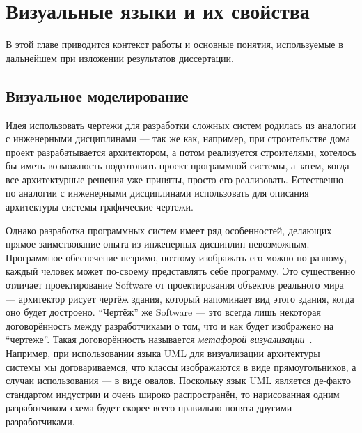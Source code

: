 \chapter{Визуальные языки и их свойства}
\label{chapter1}

В этой главе приводится контекст работы и основные понятия, используемые в 
дальнейшем при изложении результатов диссертации. 

\section{Визуальное моделирование}
Идея использовать чертежи для разработки сложных систем родилась из аналогии с 
инженерными дисциплинами --- так же как, например, при строительстве дома проект 
разрабатывается архитектором, а потом реализуется строителями, хотелось бы иметь 
возможность подготовить проект программной системы, а затем, когда все 
архитектурные решения уже приняты, просто его реализовать. Естественно по аналогии с инженерными дисциплинами 
использовать для описания архитектуры системы графические чертежи.

Однако разработка программных систем имеет ряд особенностей, делающих прямое 
заимствование опыта из инженерных дисциплин невозможным. Программное обеспечение 
незримо, поэтому изображать его можно по-разному, каждый человек может по-своему 
представлять себе программу. Это существенно отличает проектирование \ac{Software} от 
проектирования объектов реального мира --- архитектор рисует чертёж здания, 
который напоминает вид этого здания, когда оно будет достроено. "`Чертёж"' же \ac{Software} 
--- это всегда лишь некоторая договорённость между разработчиками о том, что и как будет 
изображено на "`чертеже"'. Такая договорённость называется \textit{метафорой визуализации}~\cite{averbukh2001visualization, koznov2008osnovy}. 
Например, при использовании языка \ac{UML} для визуализации архитектуры системы мы 
договариваемся, что классы изображаются в виде прямоугольников, а случаи использования --- в виде овалов. 
Поскольку язык \ac{UML} является де-факто стандартом индустрии и очень широко 
распространён, то нарисованная одним разработчиком схема будет скорее всего 
правильно понята другими разработчиками.

